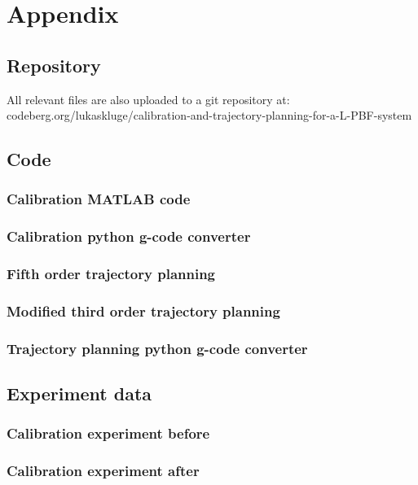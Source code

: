 \chapter{Appendix}

\section{Repository} \label{app:repository}
All relevant files are also uploaded to a git repository at: \\
\sffamily
codeberg.org/lukaskluge/calibration-and-trajectory-planning-for-a-L-PBF-system
\rmfamily

\section{Code}
\subsection{Calibration MATLAB code} \label{app:calibration-matlab}

\subsection{Calibration python g-code converter} \label{app:calibration-g-code-python}

\subsection{Fifth order trajectory planning} \label{app:quintic-planning-python}

\subsection{Modified third order trajectory planning} \label{app:cubic-planning-python}

\subsection{Trajectory planning python g-code converter} \label{app:traj-g-code}


\section{Experiment data}
\subsection{Calibration experiment before} \label{app:calibration-data}
\nopagecolor

%
\subsection{Calibration experiment after} \label{app:verification-data}


